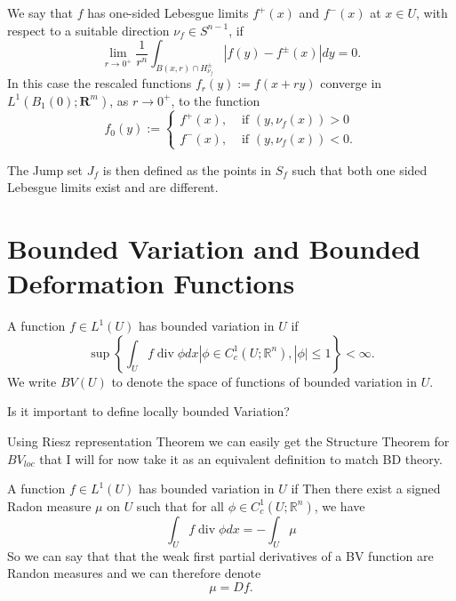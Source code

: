\begin{definition} We say that $f$ has one-sided Lebesgue limits $f^+(x)$ and $f^-(x)$ at $x\in U$, with respect to a suitable direction $\nu_f\in S^{n-1}$, if 
$$\lim _{r \rightarrow 0^{+}} \frac{1}{r^n} \int_{B\left(x, r\right)\cap H^\pm_{\nu_f}}\left|f(y)-f^{\pm}(x)\right| d y=0.$$
In this case the rescaled functions $f_{r}(y):=f(x+r y)$ converge in $L^1\left(B_1(0) ; \mathbf{R}^m\right)$, as $r \rightarrow 0^{+}$, to the function
$$
f_0(y):= \begin{cases}f^{+}(x), & \text { if }\left(y, \nu_f(x)\right)>0 \\ f^{-}(x), & \text { if }\left(y, \nu_f(x)\right)<0 .\end{cases}
$$

The Jump set $J_f$ is then defined as the points in $S_f$ such that both one sided Lebesgue limits exist and are different.

\end{definition}


\section{Bounded Variation and Bounded Deformation Functions}

\begin{definition}
A function $f \in L^1(U)$ has bounded variation in $U$ if
$$
\sup \left\{\int_U f \operatorname{div} \phi d x\left|\phi \in C_c^1\left(U ; \mathbb{R}^n\right),\right| \phi \mid \leq 1\right\}<\infty .
$$
We write
$B V(U)$
to denote the space of functions of bounded variation in $U$. 
\end{definition}

\begin{question}
Is it important to define locally bounded Variation?
\end{question}

Using Riesz representation Theorem  we can easily get the Structure Theorem for $BV_{loc}$ that I will for now take it as an equivalent definition to match BD theory.

\begin{definition} A function $f \in L^1(U)$ has bounded variation in $U$ if
Then there exist a signed Radon measure $\mu$ on $U$  such that for all $\phi \in C_c^1\left(U ; \mathbb{R}^n\right)$, we have
$$
\int_U f \operatorname{div} \phi d x=-\int_U  \mu
$$
So we can  say that that the weak first partial derivatives of a BV function are Randon measures and we can therefore denote
$$\mu =D f.$$
\end{definition}

